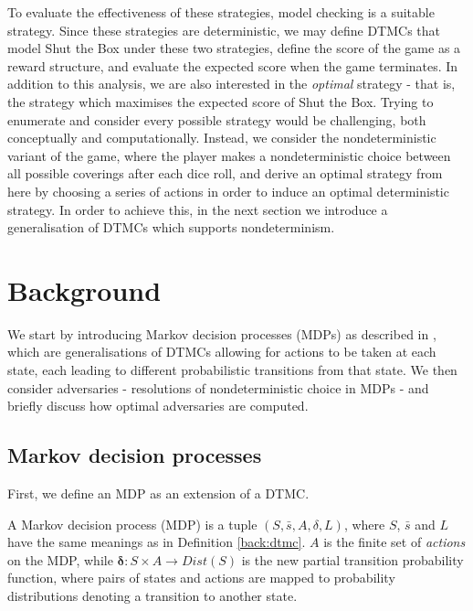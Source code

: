To evaluate the effectiveness of these strategies, model checking is a suitable strategy. Since these strategies are deterministic, we may define DTMCs that model Shut the Box under these two strategies, define the score of the game as a reward structure, and evaluate the expected score when the game terminates. In addition to this analysis, we are also interested in the \emph{optimal} strategy - that is, the strategy which maximises the expected score of Shut the Box. Trying to enumerate and consider every possible strategy would be challenging, both conceptually and computationally. Instead, we consider the nondeterministic variant of the game, where the player makes a nondeterministic choice between all possible coverings after each dice roll, and derive an optimal strategy from here by choosing a series of actions in order to induce an optimal deterministic strategy. In order to achieve this, in the next section we introduce a generalisation of DTMCs which supports nondeterminism.

\section{Background}
\label{cs1:stb_background}

We start by introducing Markov decision processes (MDPs) as described in \cite{forejt_automated_2011}, which are generalisations of DTMCs allowing for actions to be taken at each state, each leading to different probabilistic transitions from that state. We then consider adversaries - resolutions of nondeterministic choice in MDPs - and briefly discuss how optimal adversaries are computed.

\subsection{Markov decision processes}
\label{cs1:mdps}
First, we define an MDP as an extension of a DTMC.

\begin{definition}
\label{cs1:def_mdps}

A Markov decision process (MDP) is a tuple $(S, \bar{s}, A, \delta, L)$, where $S$, $\bar{s}$ and $L$ have the same meanings as in Definition \ref{back:dtmc}. $A$ is the finite set of \emph{actions} on the MDP, while  $\mathbf{\delta} : S \times A \rightarrow Dist(S)$ is the new partial transition probability function, where pairs of states and actions are mapped to probability distributions denoting a transition to another state.

\end{definition}

